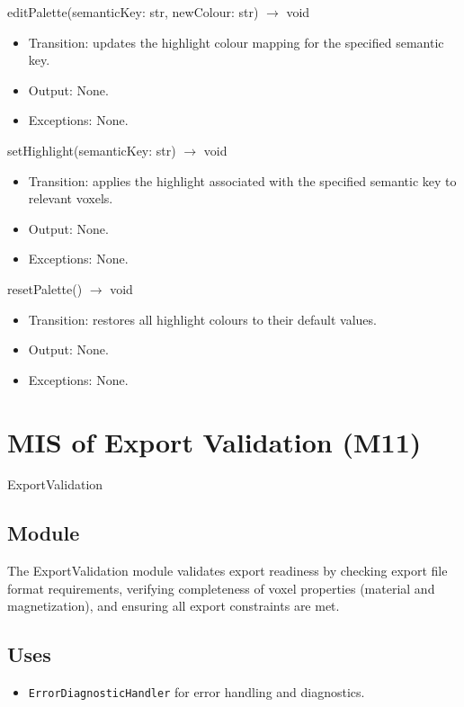 \documentclass[12pt, titlepage]{article}
\begin{document}
editPalette(semanticKey: str, newColour: str) $\rightarrow$ void
\begin{itemize}
  \item Transition: updates the highlight colour mapping for the specified semantic key.
  \item Output: None.
  \item Exceptions: None.
\end{itemize}

setHighlight(semanticKey: str) $\rightarrow$ void
\begin{itemize}
  \item Transition: applies the highlight associated with the specified semantic key to relevant voxels.
  \item Output: None.
  \item Exceptions: None.
\end{itemize}

resetPalette() $\rightarrow$ void
\begin{itemize}
  \item Transition: restores all highlight colours to their default values.
  \item Output: None.
  \item Exceptions: None.
\end{itemize}

\newpage

\section{MIS of Export Validation (M11)}\label{Module14}

ExportValidation

\subsection{Module}

The ExportValidation module validates export readiness by checking export file format requirements, verifying completeness of voxel properties (material and magnetization), and ensuring all export constraints are met. 

\subsection{Uses}
\begin{itemize}
  
  \item \texttt{ErrorDiagnosticHandler} for error handling and diagnostics.
\end{itemize}
\end{document}
